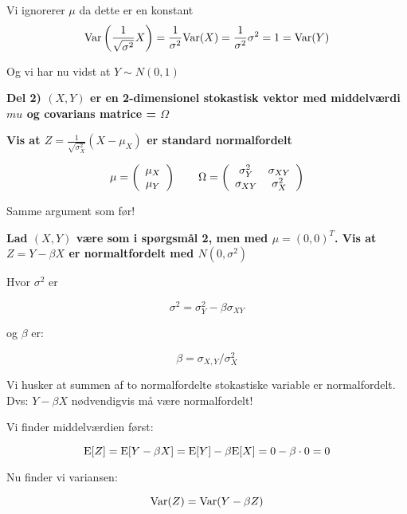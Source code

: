Vi ignorerer $\mu$ da dette er en konstant
\begin{equation}
    \text{Var}\left( \frac{1}{\sqrt{\sigma^2}}X\right) = \frac{1}{\sigma^2}\text{Var}(X) = \frac{1}{\sigma^2}\sigma^2 = 1 = \text{Var}(Y)
\end{equation}

Og vi har nu vidst at $Y\sim N(0,1)$

\textbf{Del 2) $(X,Y)$ er en 2-dimensionel stokastisk vektor med middelværdi $mu$ og covarians matrice = $\Omega$}

\textbf{Vis at $Z = \frac{1}{\sqrt{\sigma_X^2}}(X - \mu_X)$ er standard normalfordelt}

\begin{equation}
    \mu = \left(
    \begin{array}{cc}
         \mu_X  \\
         \mu_Y 
    \end{array} \right) \qquad
    \Omega = \left(
    \begin{array}{cc}
    \sigma^2_Y & \sigma_{XY} \\
    \sigma_{XY} & \sigma^2_X
    \end{array}
    \right)
\end{equation}

Samme argument som før!

\textbf{Lad $(X,Y)$ være som i spørgsmål 2, men med $\mu = (0,0)^T$. Vis at $Z = Y-\beta X$ er normaltfordelt med $N(0,\sigma^2)$}

Hvor $\sigma^2$ er 

\begin{equation}
    \sigma^2 = \sigma^2_Y - \beta \sigma_{XY}
\end{equation} 

og $\beta$ er:

\begin{equation}
    \beta = \sigma_{X,Y} / \sigma^2_X
\end{equation}

Vi husker at summen af to normalfordelte stokastiske variable er normalfordelt. Dvs: $Y - \beta X$ nødvendigvis må være normalfordelt!

Vi finder middelværdien først:

\begin{equation}
    \text{E}[Z] = \text{E}[Y - \beta X] = \text{E}[Y] - \beta \text{E}[X] = 0 - \beta\cdot 0 = 0
\end{equation}

Nu finder vi variansen:

\begin{equation}
    \text{Var}(Z) = \text{Var}(Y - \beta Z)
\end{equation}


